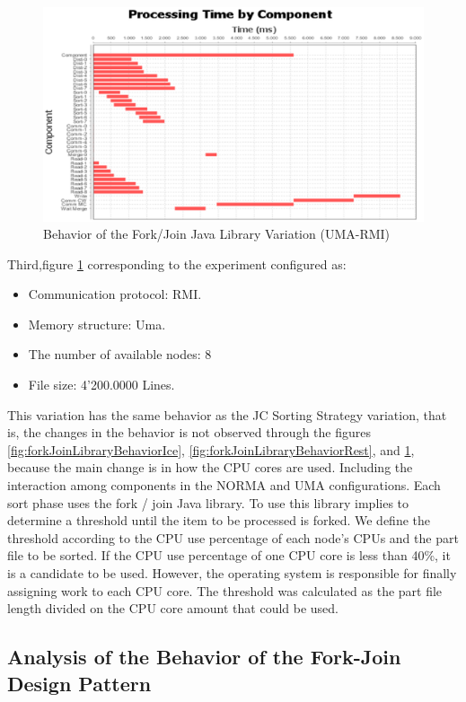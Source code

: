\begin{figure}[H]
	\centering
	\includegraphics[trim=0.5cm 17cm -5cm 1cm, scale=0.9]{fig/FJUmaRmi842Behavior.eps}
	\caption{Behavior of the Fork/Join Java Library Variation (UMA-RMI)}
	\label{fig:forkJoinLibraryBehaviorRmi}
\end{figure}
Third,figure \ref{fig:forkJoinLibraryBehaviorRmi} corresponding to the experiment configured as: 
\begin{itemize}
	\item Communication protocol: RMI.
	\item  Memory structure: Uma.
	\item The number of available nodes: 8
	\item File size: 4'200.0000 Lines.
\end{itemize}

This variation has the same behavior as the JC Sorting Strategy variation, that is, the changes in the behavior is not observed through the figures \ref{fig:forkJoinLibraryBehaviorIce}, \ref{fig:forkJoinLibraryBehaviorRest}, and \ref{fig:forkJoinLibraryBehaviorRmi}, because the main change is in how the CPU cores are used. Including the interaction among components in the NORMA and UMA configurations. Each sort phase uses the fork / join Java library. To use this library implies to determine a threshold until the item to be processed is forked. We define the threshold according to the CPU use percentage of each node's CPUs and the part file to be sorted. If the CPU use percentage of one CPU core is less than 40\%, it is a candidate to be used. However, the operating system is responsible for finally assigning work to each CPU core. The threshold was calculated as the part file length divided on the CPU core amount that could be used.

\subsection{Analysis of the Behavior of the Fork-Join Design Pattern }

